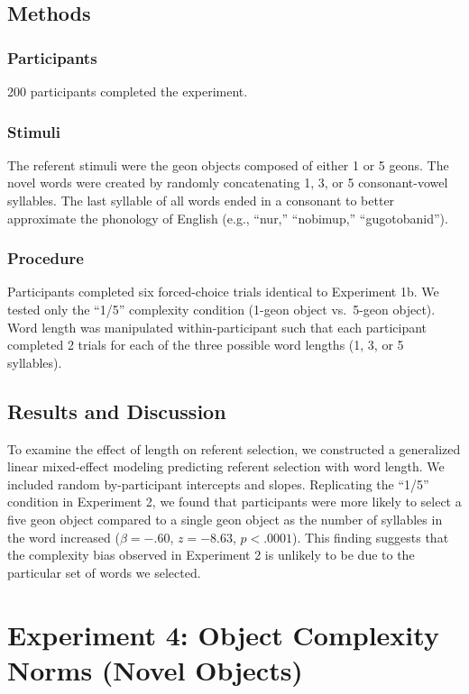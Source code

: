 \subsection{Methods}
\subsubsection{Participants} 200 participants completed the experiment.
\subsubsection{Stimuli} The referent stimuli were the geon objects composed of either 1 or 5 geons. The novel words were created by randomly concatenating 1, 3, or 5 consonant-vowel syllables. The last syllable of all words ended in a consonant to better approximate the phonology of English (e.g., ``nur,'' ``nobimup,'' ``gugotobanid'').

\subsubsection{Procedure}
Participants completed six forced-choice trials identical to Experiment 1b. We tested only the ``1/5'' complexity condition (1-geon object vs.\ 5-geon object). Word length was manipulated within-participant such that each participant completed 2 trials for each of the three possible word lengths (1, 3, or 5 syllables).

\subsection{Results and Discussion}
To examine the effect of length on referent selection, we constructed a generalized linear mixed-effect modeling predicting referent selection with word length. We included random by-participant intercepts and slopes. Replicating the ``1/5'' condition in Experiment 2, we found that participants were more likely to select a five geon object compared to a single geon object as the number of syllables in the word increased ($\beta=-.60$, $z =-8.63$, $p <.0001$). This finding suggests that the complexity bias observed in Experiment 2 is unlikely to be due to the particular set of words we selected.

\section{Experiment 4: Object Complexity Norms (Novel Objects)}
\label{ch2-4}

